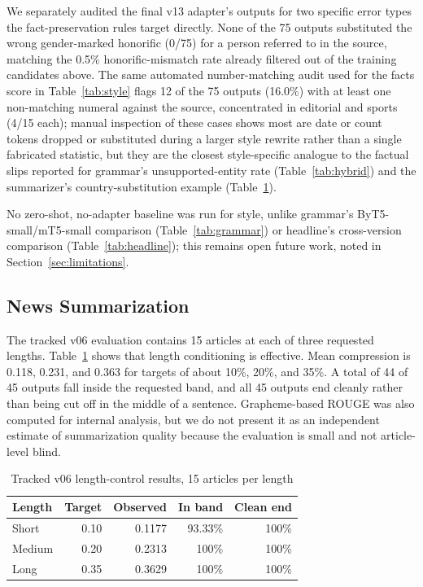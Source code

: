 \documentclass[a4paper,conference]{IEEEtran}
\begin{document}
We separately audited the final v13 adapter's outputs for two specific error
types the fact-preservation rules target directly. None of the 75 outputs
substituted the wrong gender-marked honorific (0/75) for a person referred to
in the source, matching the 0.5\% honorific-mismatch rate already filtered
out of the training candidates above. The same automated number-matching
audit used for the facts score in Table~\ref{tab:style} flags 12 of the 75
outputs (16.0\%) with at least one non-matching numeral against the source,
concentrated in editorial and sports (4/15 each); manual inspection of these
cases shows most are date or count tokens dropped or substituted during a
larger style rewrite rather than a single fabricated statistic, but they are
the closest style-specific analogue to the factual slips reported for
grammar's unsupported-entity rate (Table~\ref{tab:hybrid}) and the
summarizer's country-substitution example (Table~\ref{tab:summary}).

No zero-shot, no-adapter baseline was run for style, unlike grammar's
ByT5-small/mT5-small comparison (Table~\ref{tab:grammar}) or headline's
cross-version comparison (Table~\ref{tab:headline}); this remains open future
work, noted in Section~\ref{sec:limitations}.

\subsection{News Summarization}
The tracked v06 evaluation contains 15 articles at each of three requested
lengths. Table~\ref{tab:summary} shows that length conditioning is effective.
Mean compression is 0.118, 0.231, and 0.363 for targets of about 10\%, 20\%,
and 35\%. A total of 44 of 45 outputs fall inside the requested band, and all
45 outputs end cleanly rather than being cut off in the middle of a sentence.
Grapheme-based ROUGE was also computed for internal analysis, but we do not
present it as an independent estimate of summarization quality because the
evaluation is small and not article-level blind.

\begin{table}[!b]
\caption{Tracked v06 length-control results, 15 articles per length}
\label{tab:summary}
\centering
\footnotesize
\setlength{\tabcolsep}{3.2pt}
\renewcommand{\arraystretch}{1.03}
\begin{tabular}{|l|r|r|r|r|}
\hline
\textbf{Length} & \textbf{Target} & \textbf{Observed} & \textbf{In band} & \textbf{Clean end} \\
\hline
Short  & 0.10 & 0.1177 & 93.33\% & 100\% \\
\hline
Medium & 0.20 & 0.2313 & 100\% & 100\% \\
\hline
Long   & 0.35 & 0.3629 & 100\% & 100\% \\
\hline
\end{tabular}
\end{table}
\end{document}
